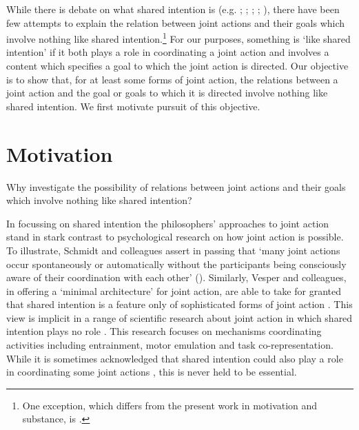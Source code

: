 \documentclass[12pt,a4paper]{extarticle}
\begin{document}
While there is debate on what shared intention is (e.g. 
	\citealp{Kutz:2000si}; 
	\citealp{Tollefsen:2005vh}; 
	\citealp{gilbert_walking_1990};
	\citealp[pp.\ 74--81]{miller_social_2001};
	\citealp{tuomela_collective_2000}), 
there have been few attempts to explain the relation between joint actions and their goals which  involve nothing like shared intention.\footnote{ 
One exception, which differs from the present work in motivation and substance, is \citet{Roth:2004ki}.
}
For our purposes, something is `like shared intention' if it both plays a role in coordinating a joint action and  involves a content which specifies a goal to which the joint action is directed.
Our objective is to show that, for at least some forms of joint action, the relations between a joint action and the goal or goals to which it is directed involve nothing like shared intention.  
We first motivate pursuit of this objective.

\section{Motivation}
Why investigate the possibility of relations between joint actions and their goals which involve nothing like shared intention?
  
In focussing on shared intention the philosophers' approaches to joint action stand in stark contrast to psychological research on how joint action is possible.
To illustrate, Schmidt and colleagues assert in passing that `many joint actions occur spontaneously or automatically without the participants being consciously aware of their coordination with each other' (\citeyear[p. 7]{schmidt_understanding_2010}).
Similarly, Vesper and colleagues, in offering a `minimal architecture' for joint action, are able to take for granted that shared intention is a feature only of sophisticated forms of joint action \citep{vesper_minimal_2010}.
This view is implicit in a range of scientific research about joint action in which shared intention plays no role 
	\citep[as reviewed in][]{%
		Knoblich:2010fk,
		Sebanz:2006yq%
	}.
This research focuses on mechanisms coordinating activities including entrainment, motor emulation and task co-representation.  
While it is sometimes acknowledged that shared intention could also play a role in coordinating some joint actions \citep[e.g.][]{Knoblich:2008hy}, this is never held to be essential.
\end{document}
